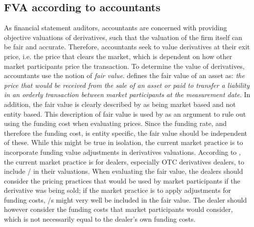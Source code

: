 \documentclass[main.tex]{subfiles}
\begin{document}
        \subsection{FVA according to accountants}
            As financial statement auditors, accountants are concerned with providing objective valuations of derivatives,
            such that the valuation of the firm itself can be fair and accurate.
            Therefore, accountants seek to value derivatives at their exit price, i.e. the price that clears the market,
            which is dependent on how other market participants price the transaction.
            To determine the value of derivatives, accountants use the notion of \textit{fair value}.
            \textcite{IFRS13} defines the fair value of an asset as: 
            \textit{the price that would be received from the sale of an asset or paid to transfer a liability
            in an orderly transaction between market participants at the measurement date}.
            In addition, the fair value is clearly described by \textcite{IFRS13} as being market based and not entity based.
            This description of fair value is used by \textcite{HullWhiteFVA} as an argument to
            rule out using the funding cost when evaluating prices.
            Since the funding rate, and therefore the funding cost, is entity specific,
            the fair value should be independent of these.
            While this might be true in isolation, 
            the current market practice is to incorporate funding value adjustments in derivatives valuations.
            According to \textcite{KPMGFVA}, the current market practice is for dealers, especially OTC derivatives dealers,
            to include \FVA/ in their valuations.  
            When evaluating the fair value, the dealers should consider the pricing practices 
            that would be used by market participants if the derivative was being sold;
            if the market practice is to apply adjustments for funding costs,
            \FVA/s might very well be included in the fair value.
            The dealer should however consider the funding costs that market participants would consider,
            which is not necessarily equal to the dealer's own funding costs.
\end{document}

